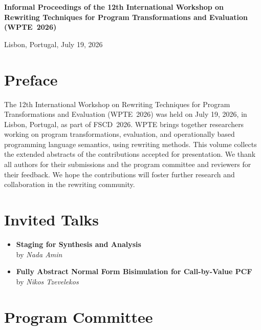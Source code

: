 \documentclass[a4paper,11pt]{article}
\begin{document}
\begin{titlepage}
\centering
{\LARGE \textbf{Informal Proceedings of the 12th International Workshop on Rewriting Techniques for Program Transformations and Evaluation (WPTE~2026)}\par}
\vspace{1cm}
{\Large Lisbon, Portugal, July 19, 2026\par}

\vfill

\section*{Preface}

The 12th International Workshop on Rewriting Techniques for Program Transformations and Evaluation (WPTE~2026) was held on July 19, 2026, in Lisbon, Portugal, as part of FSCD~2026.
WPTE brings together researchers working on program transformations, evaluation, and operationally based programming language semantics, using rewriting methods.
This volume collects the extended abstracts of the contributions accepted for presentation.
We thank all authors for their submissions and the program committee and reviewers for their feedback.
We hope the contributions will foster further research and collaboration in the rewriting community.

\vfill
\vfill

\section*{Invited Talks}

\begin{itemize}
\item
  \textbf{Staging for Synthesis and Analysis}\\
  \protect\hspace{1.5em}
  by {\itshape Nada Amin}
\item
  \textbf{Fully Abstract Normal Form Bisimulation for Call-by-Value PCF}\\
  \protect\hspace{1.5em}
  by {\itshape Nikos Tzevelekos}
\end{itemize}

\vfill

\section*{Program Committee}


\end{titlepage}
\end{document}
